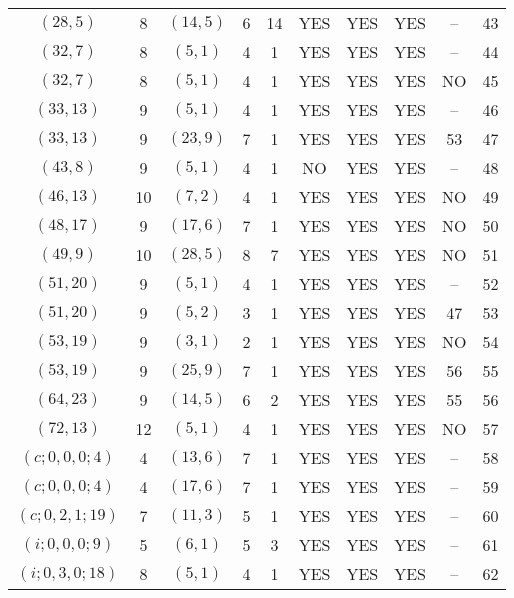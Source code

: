 \begin{longtable}{|c|c|c|c|c|c|c|c|c|c|}
$(28, 5)$ & 8 & $(14, 5)$ & 6 & 14 & YES & YES & YES & -- & 43\\
$(32, 7)$ & 8 & $(5, 1)$ & 4 & 1 & YES & YES & YES & -- & 44\\
$(32, 7)$ & 8 & $(5, 1)$ & 4 & 1 & YES & YES & YES & NO & 45\\
$(33, 13)$ & 9 & $(5, 1)$ & 4 & 1 & YES & YES & YES & -- & 46\\
$(33, 13)$ & 9 & $(23, 9)$ & 7 & 1 & YES & YES & YES & 53 & 47\\
$(43, 8)$ & 9 & $(5, 1)$ & 4 & 1 & NO & YES & YES & -- & 48\\
$(46, 13)$ & 10 & $(7, 2)$ & 4 & 1 & YES & YES & YES & NO & 49\\
$(48, 17)$ & 9 & $(17, 6)$ & 7 & 1 & YES & YES & YES & NO & 50\\
$(49, 9)$ & 10 & $(28, 5)$ & 8 & 7 & YES & YES & YES & NO & 51\\
$(51, 20)$ & 9 & $(5, 1)$ & 4 & 1 & YES & YES & YES & -- & 52\\
$(51, 20)$ & 9 & $(5, 2)$ & 3 & 1 & YES & YES & YES & 47 & 53\\
$(53, 19)$ & 9 & $(3, 1)$ & 2 & 1 & YES & YES & YES & NO & 54\\
$(53, 19)$ & 9 & $(25, 9)$ & 7 & 1 & YES & YES & YES & 56 & 55\\
$(64, 23)$ & 9 & $(14, 5)$ & 6 & 2 & YES & YES & YES & 55 & 56\\
$(72, 13)$ & 12 & $(5, 1)$ & 4 & 1 & YES & YES & YES & NO & 57\\
$(c; 0, 0, 0; 4)$ & 4 & $(13, 6)$ & 7 & 1 & YES & YES & YES & -- & 58\\
$(c; 0, 0, 0; 4)$ & 4 & $(17, 6)$ & 7 & 1 & YES & YES & YES & -- & 59\\
$(c; 0, 2, 1; 19)$ & 7 & $(11, 3)$ & 5 & 1 & YES & YES & YES & -- & 60\\
$(i; 0, 0, 0; 9)$ & 5 & $(6, 1)$ & 5 & 3 & YES & YES & YES & -- & 61\\
$(i; 0, 3, 0; 18)$ & 8 & $(5, 1)$ & 4 & 1 & YES & YES & YES & -- & 62
\end{longtable}
